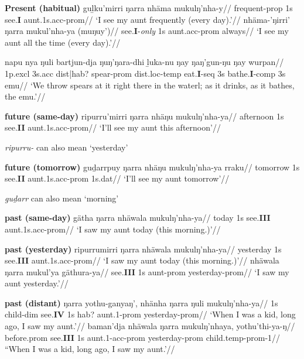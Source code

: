 \pex \textbf{Present (habitual)}
\a\begingl\gla guḻku'mirri ŋarra nhäma mukulŋ'nha-y//
\glb frequent-\gls{prop} 1s see.\textbf{I} aunt.1s.\gls{acc}-\gls{prom}//
\glft`I see my aunt frequently (every day).'\trailingcitation{[RN~20190520]}//
\endgl
\a\begingl\gla nhäma-'ŋirri' ŋarra mukul'nha-ya (muŋuy')//
\glb see.\textbf{I}-\textit{only} 1s aunt.\gls{acc}-\gls{prom} always//
\glft`I see my aunt all the time (every day).'\trailingcitation{[AL~20190522~1min30s]}//\endgl

\a\begingl\gla napu nya ŋuli bartjun-dja ŋuŋ'ŋara-dhi ḻuka-nu ŋay ŋaŋ'gun-ŋu ŋay wurpan//
\glb 1p.\gls{excl} 3s.\gls{acc} \gls{dist}|\gls{hab}? spear-\gls{prom} \gls{dist}.\gls{loc}-\gls{temp} eat.\textbf{I}-\gls{seq} 3s bathe.\textbf{I}-\gls{comp} 3s emu//
\glft`We throw spears at it right there in the waterl; as it drinks, as it bathes, the emu.'//\endgl

\xe

\pex\textbf{future (same-day)}
\a\begingl\gla  ripurru'mirri ŋarra nhäŋu mukulŋ'nha-ya//
\glb afternoon 1s see.\textbf{II} aunt.1s.\gls{acc}-\gls{prom}//
\glft`I'll see my aunt this afternoon'\trailingcitation{[RN~20190520]}//\endgl\xe

\textit{ripurru-} can also mean `yesterday'

\pex\textbf{future (tomorrow)}
\a\begingl\gla  guḏarrpuy ŋarra nhäŋu mukulŋ'nha-ya rraku//
\glb tomorrow 1s see.\textbf{II} aunt.1s.\gls{acc}-\gls{prom} 1s.\gls{dat}//
\glft`I'll see my aunt tomorrow'\trailingcitation{[RN~20190520]}//\endgl\xe

\textit{guḏarr} can also mean `morning'

\pex\textbf{past (same-day)}
\a\begingl\gla gätha ŋarra nhäwala mukulŋ'nha-ya//
\glb today 1s see.\textbf{III} aunt.1s.\gls{acc}-\gls{prom}//
\glft`I saw my aunt today (this morning.)'\trailingcitation{[RN~20190520]}//\endgl
\xe

\pex\textbf{past (yesterday)}
\a\begingl\gla ripurrumirri ŋarra nhäwala mukulŋ'nha-ya//
\glb yesterday 1s see.\textbf{III} aunt.1s.\gls{acc}-\gls{prom}//
\glft`I saw my aunt today (this morning.)'\trailingcitation{[RN~20190520]}//\endgl
\a\begingl\gla  nhäwala ŋarra mukul'ya gäthura-ya//
\glb see.\textbf{III} 1s aunt-\gls{prom} yesterday-\gls{prom}//
\glft`I saw my aunt yesterday.'\trailingcitation{[DW~20190522~5min11s]}//\endgl\xe


\pex\textbf{past (distant)}
\a\begingl\gla ŋarra yothu-ganyaŋ', nhänha ŋarra ŋuli mukulŋ'nha-ya//
\glb 1s child-\gls{dim} see.\textbf{IV} 1s \gls{hab}? aunt.1-\gls{prom} yesterday-\gls{prom}//
\glft`When  I was a kid, long ago, I saw my aunt.'\trailingcitation{[RN~20190520]}//\endgl
\a\begingl\gla  baman'dja nhäwala ŋarra mukulŋ'nhaya, yothu'thi-ya-ŋ//
\glb before.\gls{prom} see.\textbf{III} 1s aunt.1-\gls{acc}-\gls{prom} yesterday-\gls{prom} child.\gls{temp}-\gls{prom}-1//
\glft``When  I was a kid, long ago, I saw my aunt.'\trailingcitation{[DW~20190522~6min17s]}//\endgl\xe

